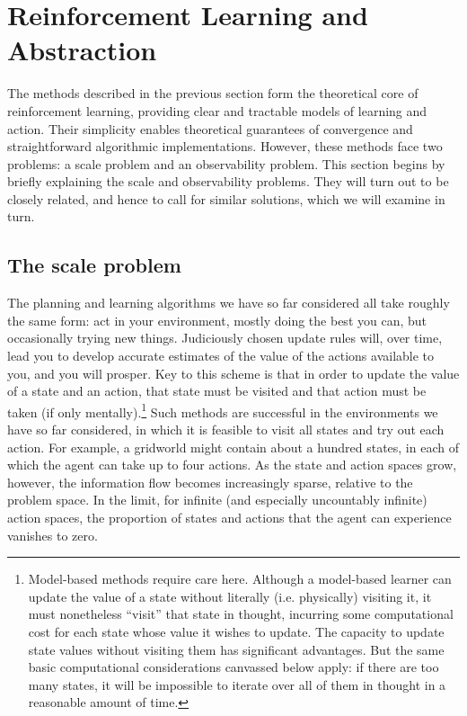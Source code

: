 \section{Reinforcement Learning and Abstraction}


The methods described in the previous section form the theoretical core of reinforcement learning, providing clear and tractable models of learning and action.
Their simplicity enables theoretical guarantees of convergence and straightforward algorithmic implementations. 
However, these methods face two problems: a scale problem and an observability problem.
This section begins by briefly explaining the scale and observability problems.
They will turn out to be closely related, and hence to call for similar solutions, which we will examine in turn.

\subsection{The scale problem}

The planning and learning algorithms we have so far considered all take roughly the same form: act in your environment, mostly doing the best you can, but occasionally trying new things.
Judiciously chosen update rules will, over time, lead you to develop accurate estimates of the value of the actions available to you, and you will prosper.
Key to this scheme is that in order to update the value of a state and an action, that state must be visited and that action must be taken (if only mentally).\footnote{Model-based methods require care here. Although a model-based learner can update the value of a state without literally (i.e. physically) visiting it, it must nonetheless ``visit'' that state in thought, incurring some computational cost for each state whose value it wishes to update. The capacity to update state values without visiting them has significant advantages. But the same basic computational considerations canvassed below apply: if there are too many states, it will be impossible to iterate over all of them in thought in a reasonable amount of time.}
Such methods are successful in the environments we have so far considered, in which it is feasible to visit all states and try out each action.
For example, a gridworld might contain about a hundred states, in each of which the agent can take up to four actions.
As the state and action spaces grow, however, the information flow becomes increasingly sparse, relative to the problem space.
In the limit, for infinite (and especially uncountably infinite) action spaces, the proportion of states and actions that the agent can experience vanishes to zero.

